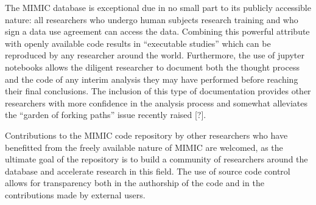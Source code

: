 \documentclass{elsart}
\begin{document}
The MIMIC database is exceptional due in no small part to its publicly accessible nature: all researchers who undergo human subjects research training and who sign a data use agreement can access the data. Combining this powerful attribute with openly available code results in ``executable studies'' which can be reproduced by any researcher around the world. Furthermore, the use of jupyter notebooks allows the diligent researcher to document both the thought process and the code of any interim analysis they may have performed before reaching their final conclusions. The inclusion of this type of documentation provides other researchers with more confidence in the analysis process and somewhat alleviates the ``garden of forking paths'' issue recently raised [?].

Contributions to the MIMIC code repository by other researchers who have benefitted from the freely available nature of MIMIC are welcomed, as the ultimate goal of the repository is to build a community of researchers around the database and accelerate research in this field. The use of source code control allows for transparency both in the authorship of the code and in the contributions made by external users.








\end{document}
